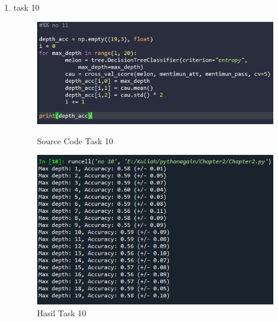\begin{enumerate}
\newpage
\item task 10
\begin{figure}[!htbp]
    \centering
    \includegraphics[scale=0.5]{figures/Chap11-1.JPG}
	\caption{Source Code Task 10}
    \includegraphics[scale=0.5]{figures/Chap10-1.1.JPG}
	\caption{Hasil Task 10}
\end{figure}



\end{enumerate}
